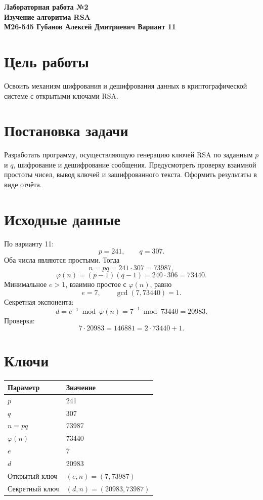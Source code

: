 \documentclass[12pt]{article}
\begin{document}
\begin{center}
\textbf{Лабораторная работа №2}\\
\textbf{Изучение алгоритма RSA}\\
\textbf{М26-545 Губанов Алексей Дмитриевич Вариант 11}
\end{center}

\section{Цель работы}
Освоить механизм шифрования и дешифрования данных в криптографической системе с открытыми ключами RSA.

\section{Постановка задачи}
Разработать программу, осуществляющую генерацию ключей RSA по заданным \(p\) и \(q\), шифрование и дешифрование сообщения. Предусмотреть проверку взаимной простоты чисел, вывод ключей и зашифрованного текста. Оформить результаты в виде отчёта.

\section{Исходные данные}
По варианту 11:
\[
p=241,\qquad q=307.
\]
Оба числа являются простыми. Тогда
\[
n=pq=241\cdot 307=73987,
\]
\[
\varphi(n)=(p-1)(q-1)=240\cdot 306=73440.
\]
Минимальное \(e>1\), взаимно простое с \(\varphi(n)\), равно
\[
e=7,\qquad \gcd(7,73440)=1.
\]
Секретная экспонента:
\[
d=e^{-1}\bmod \varphi(n)=7^{-1}\bmod 73440=20983.
\]
Проверка:
\[
7\cdot 20983=146881=2\cdot 73440+1.
\]

\section{Ключи}
\begin{center}
\begin{tabular}{ll}
\toprule
Параметр & Значение \\
\midrule
\(p\) & 241 \\
\(q\) & 307 \\
\(n=pq\) & 73987 \\
\(\varphi(n)\) & 73440 \\
\(e\) & 7 \\
\(d\) & 20983 \\
Открытый ключ & \((e,n)=(7,73987)\) \\
Секретный ключ & \((d,n)=(20983,73987)\) \\
\bottomrule
\end{tabular}
\end{center}
\end{document}
